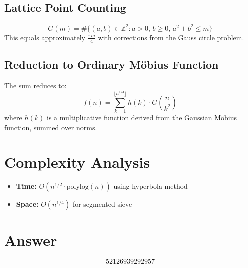 \documentclass[11pt]{article}
\begin{document}
\subsection{Lattice Point Counting}
\[
G(m) = \#\{(a,b) \in \mathbb{Z}^2 : a > 0,\, b \geq 0,\, a^2 + b^2 \leq m\}
\]
This equals approximately $\frac{\pi m}{4}$ with corrections from the Gauss circle problem.

\subsection{Reduction to Ordinary M\"obius Function}
The sum reduces to:
\[
f(n) = \sum_{k=1}^{\lfloor n^{1/4} \rfloor} h(k) \cdot G\!\left(\frac{n}{k^2}\right)
\]
where $h(k)$ is a multiplicative function derived from the Gaussian M\"obius function, summed over norms.

\section{Complexity Analysis}
\begin{itemize}
    \item \textbf{Time:} $O(n^{1/2} \cdot \text{polylog}(n))$ using hyperbola method
    \item \textbf{Space:} $O(n^{1/4})$ for segmented sieve
\end{itemize}

\section{Answer}

\[
\boxed{52126939292957}
\]
\end{document}
